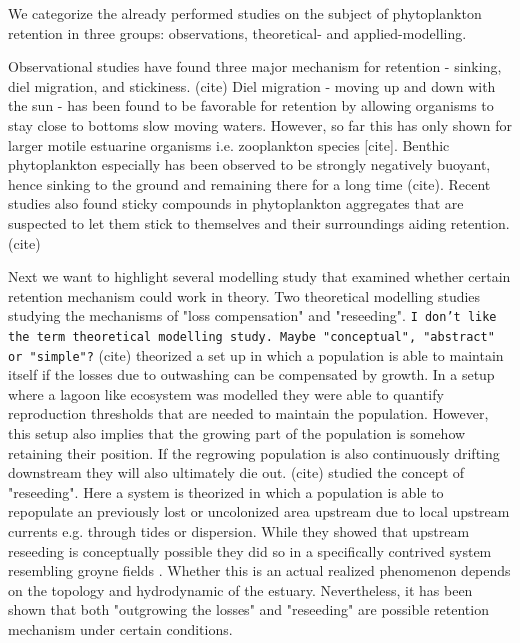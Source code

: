

We categorize the already performed studies on the subject of phytoplankton retention in three groups: observations, theoretical- and applied-modelling.

Observational studies have found three major mechanism for retention - sinking, diel migration, and stickiness. (cite)
Diel migration - moving up and down with the sun -  has been found to be favorable for retention by allowing organisms to stay close to bottoms slow moving waters.
However, so far this has only shown for larger motile estuarine organisms i.e. zooplankton species [cite].
Benthic phytoplankton especially has been observed to be strongly negatively buoyant, hence sinking to the ground and remaining there for a long time (cite).
Recent studies also found sticky compounds in phytoplankton aggregates that are suspected to let them stick to themselves and their surroundings aiding retention. (cite)



Next we want to highlight several modelling study that examined whether certain retention mechanism could work in theory.
Two theoretical modelling studies studying the mechanisms of "loss compensation" and "reseeding".
\texttt{I don't like the term theoretical modelling study. Maybe "conceptual", "abstract" or "simple"?}
(cite) theorized a set up in which a population is able to maintain itself if the losses due to outwashing can be compensated by growth.
In a setup where a lagoon like ecosystem was modelled they were able to quantify reproduction thresholds that are needed to maintain the population.
However, this setup also implies that the growing part of the population is somehow retaining their position.
If the regrowing population is also continuously drifting downstream they will also ultimately die out.
(cite) studied the concept of "reseeding".
Here a system is theorized in which a population is able to repopulate an previously 
lost or uncolonized area upstream due to local upstream currents e.g. through tides or dispersion.
While they showed that upstream reseeding is conceptually possible they did so in a specifically contrived system resembling groyne fields .
Whether this is an actual realized phenomenon depends on the topology and hydrodynamic of the estuary.
Nevertheless, it has been shown that both "outgrowing the losses" and "reseeding" are possible retention mechanism under certain conditions.

